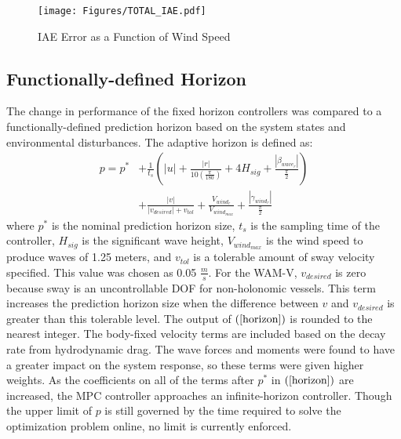 \documentclass[letterpaper, 10 pt, conference]{ieeeconf}  %
\begin{document}
\begin{figure}[tb]
  \centering
  \texttt{[image: Figures/TOTAL\_IAE.pdf]}
  \caption{IAE Error as a Function of Wind Speed}
  \label{fig:IAE_total}
\end{figure}

\subsection{Functionally-defined Horizon}

The change in performance of the fixed horizon controllers was compared to a functionally-defined prediction horizon based on the system states and environmental disturbances. The adaptive horizon is defined as:
%
\begin{align}
\label{horizon}
p = p^* &+ \frac{1}{t_s}\left(|u| + \frac{|r|}{10\left(\frac{\pi}{180}\right)} + 4H_{sig} + \frac{|\beta_{wave_{r}}|}{\frac{\pi}{2}}\right)\\
&+ \frac{|v|}{|v_{desired}| + v_{tol}} + \frac{V_{wind_r}}{V_{wind_{max}}} + \frac{|\gamma_{wind_r}|}{\frac{\pi}{2}} \nonumber
\end{align}
%
where $p^*$ is the nominal prediction horizon size, $t_s$ is the sampling time of the controller, $H_{sig}$ is the significant wave height, $V_{wind_{max}}$ is the wind speed to produce waves of 1.25 meters, and $v_{tol}$ is a tolerable amount of sway velocity specified. This value was chosen as 0.05 $\frac{m}{s}$. For the WAM-V, $v_{desired}$ is zero because sway is an uncontrollable DOF for non-holonomic vessels. This term increases the prediction horizon size when the difference between $v$ and $v_{desired}$ is greater than this tolerable level. The output of $\left(\ref{horizon}\right)$ is rounded to the nearest integer. The body-fixed velocity terms are included based on the decay rate from hydrodynamic drag. The wave forces and moments were found to have a greater impact on the system response, so these terms were given higher weights. As the coefficients on all of the terms after $p^*$ in $\left(\ref{horizon}\right)$ are increased, the MPC controller approaches an infinite-horizon controller. Though the upper limit of $p$ is still governed by the time required to solve the optimization problem online, no limit is currently enforced.
\end{document}
